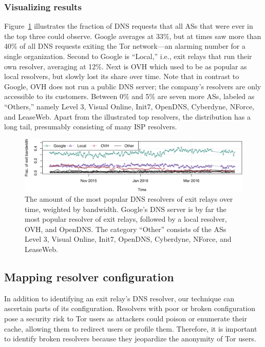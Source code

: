 \subsubsection{Visualizing results}
Figure~\ref{fig:exit-resolvers} illustrates the fraction of DNS requests that
all ASs that were ever in the top three could observe.  Google averages at
33\%, but at times saw more than 40\% of all DNS requests exiting the Tor
network---an alarming number for a single organization.  Second to Google is
``Local,'' i.e., exit relays that run their own resolver, averaging at 12\%.
Next is OVH which used to be as popular as local resolvers, but slowly lost its
share over time.  Note that in contrast to Google, OVH does not run a public
DNS server; the company's resolvers are only accessible to its customers.
Between 0\% and 5\% are seven more ASs, labeled as ``Others,'' namely Level 3,
Visual Online, Init7, OpenDNS, Cyberdyne, NForce, and LeaseWeb.  Apart from the
illustrated top resolvers, the distribution has a long tail, presumably
consisting of many ISP resolvers.

\begin{figure}[t]
	\centering
	\includegraphics[width=0.9\linewidth]{figures/exit-resolvers.pdf}
	\caption{The amount of the most popular DNS resolvers of exit relays over
		time, weighted by bandwidth.  Google's DNS server is by far the most
		popular resolver of exit relays, followed by a local resolver, OVH, and
		OpenDNS.  The category ``Other'' consists of the ASs Level 3, Visual
		Online, Init7, OpenDNS, Cyberdyne, NForce, and LeaseWeb.}
	\label{fig:exit-resolvers}
\end{figure}

\iffalse
\subsection{Mapping resolver configuration}
\label{sec:mapping-configuration}
In addition to identifying an exit relay's DNS resolver, our technique can
ascertain parts of its configuration.  Resolvers with poor or broken
configuration pose a security risk to Tor users as attackers could poison or
enumerate their cache, allowing them to redirect users or profile them.
Therefore, it is important to identify broken resolvers because they jeopardize
the anonymity of Tor users.

